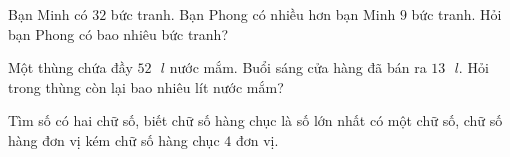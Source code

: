 \begin{bt}[1,5 điểm]
Bạn Minh có $32$ bức tranh. Bạn Phong có nhiều hơn bạn Minh $9$ bức tranh. Hỏi bạn Phong có bao nhiêu bức tranh?
\end{bt}

\begin{bt}[1,0 điểm]
Một thùng chứa đầy $52\text{ }l$ nước mắm. Buổi sáng cửa hàng đã bán ra $13\text{ }l$. Hỏi trong thùng còn lại bao nhiêu lít nước mắm?
\end{bt}

\begin{bt}[1,0 điểm]
Tìm số có hai chữ số, biết chữ số hàng chục là số lớn nhất có một chữ số, chữ số hàng đơn vị kém chữ số hàng chục $4$ đơn vị.
\end{bt}

